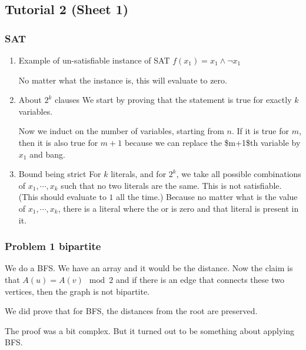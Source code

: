 \documentclass[11pt]{article}
\begin{document}
\subsection{Tutorial 2 (Sheet 1)}
\label{sec:org1944439}
\subsubsection{SAT}
\label{sec:org88f2e8c}
\begin{enumerate}
\item Example of un-satisfiable instance of SAT
\label{sec:org40c588e}
\(f(x_1) = x_1 \wedge \neg x_1\)

No matter what the instance is, this will evaluate to zero.
\item About \(2^k\) clauses
\label{sec:orgbf86876}
We start by proving that the statement is true for exactly \(k\) variables.

Now we induct on the number of variables, starting from \(n\). If it is true
for \(m\), then it is also true for \(m+1\) because we can replace the \$m+1\$th
variable by \(x_1\) and bang.
\item Bound being strict
\label{sec:orgf57300c}
For \(k\) literals, and for \(2^k\), we take all possible combinations of \(x_1,
     \cdots, x_k\) such that no two literals are the same. This is not
satisfiable. (This should evaluate to \(1\) all the time.) Because no matter
what is the value of \(x_1, \cdots, x_k\), there is a literal where the or is
zero and that literal is present in it.
\end{enumerate}
\subsubsection{Problem 1 bipartite}
\label{sec:org0fd7b8d}
We do a BFS. We have an array and it would be the distance. Now the claim is
that \(A(u) = A(v) \mod 2\) and if there is an edge that connects these two
vertices, then the graph is not bipartite.

We did prove that for BFS, the distances from the root are preserved.

The proof was a bit complex. But it turned out to be something about
applying BFS.
\end{document}
